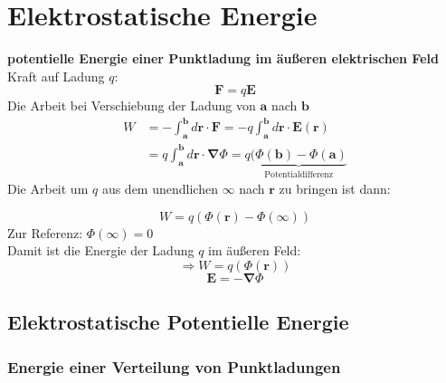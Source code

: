 \documentclass[titlepage,11pt,a4paper,ngerman]{report}
\newcommand{\tx}[1]{\textrm{#1}}
\newcommand{\ub}[1]{\underbrace{#1}}
\renewcommand{\Phi}{\varPhi}
\renewcommand{\vec}[1]{\boldsymbol{#1}}
\renewcommand{\paragraph}[1]{\subsubsection{#1}}
\begin{document}
\section{Elektrostatische Energie}
\textbf{potentielle Energie einer Punktladung im äußeren elektrischen Feld}\\
Kraft auf Ladung $ q $:
\begin{equation*}
\vec{F} = q \vec{E}
\end{equation*}
Die Arbeit bei Verschiebung der Ladung von $ \vec{a} $ nach $ \vec{b} $
\begin{align*}
W &= - \int_{\vec{a}}^{\vec{b}} d\vec{r} \cdot \vec{F} = - q \int_{\vec{a}}^{\vec{b}} d\vec{r} \cdot \vec{E}(\vec{r})\\
&= q \int_{\vec{a}}^{\vec{b}} d\vec{r} \cdot \vec{\nabla} \Phi = q \ub{( \Phi(\vec{b}) - \Phi(\vec{a})}_{\tx{Potentialdifferenz}}
\end{align*}
Die Arbeit um $ q $ aus dem unendlichen $ \infty $ nach $ \vec{r} $ zu bringen ist dann:

\begin{equation*}
W = q (\Phi(\vec{r}) - \Phi(\infty))
\end{equation*}
Zur Referenz: $ \Phi(\infty) = 0 $\\
Damit ist die Energie der Ladung $ q $ im äußeren Feld:
\begin{equation*}
\Rightarrow W = q (\Phi(\vec{r}))
\end{equation*}
\begin{equation*}
\vec{E} = - \vec{\nabla} \Phi
\end{equation*}




\subsection{Elektrostatische Potentielle Energie}

\paragraph{Energie einer Verteilung von Punktladungen}
\end{document}
